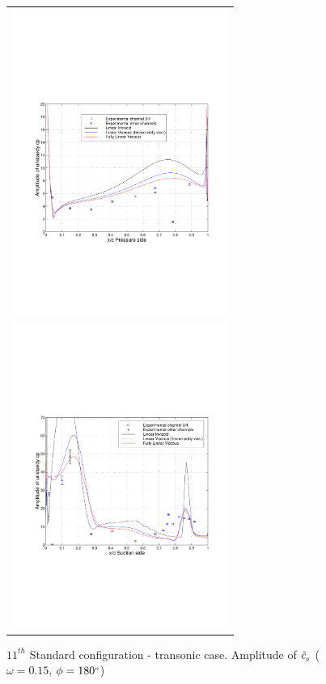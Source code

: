 %
\begin{figure}
 \begin{center}
  \begin{tabular}{c}
    {\includegraphics[height=100mm,clip=t]{CHAP_LINEAR/FIGURE/unsteady_blade_099_180_1.pdf}}\\
    {\includegraphics[height=100mm,clip=t]{CHAP_LINEAR/FIGURE/unsteady_blade_099_180_2.pdf}}
  \end{tabular}
 \end{center}
 \vspace{-7mm}
 \caption{$11^{th}$ Standard configuration - transonic case.
          Amplitude of $\tilde{c}_{\mbox{\tiny $p$}}$
         ($\omega = 0.15$, $\phi = 180^{\mbox{\tiny $o$}}$)}
 \label{transonic_11_ampl.fig}
\end{figure}
